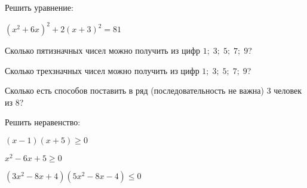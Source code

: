 \begin{listofex}
		\item Решить уравнение:
	\begin{enumcols}[itemcolumns=2]
		\item {}
		\item {}
		\item \( (x^2+6x)^2+2(x+3)^2=81 \) 
		\item {}
	\end{enumcols}
	\item Сколько пятизначных чисел можно получить из цифр \( 1;\;3;\;5;\;7;\;9 \)?
	\item Сколько трехзначных чисел можно получить из цифр \( 1;\;3;\;5;\;7;\;9 \)?
	\item Сколько есть способов поставить в ряд (последовательность не важна) 3 человек из 8?
	\item {}
	\item Решить неравенство:
	\begin{enumcols}[itemcolumns=2]
		\item \( (x-1)(x+5)\ge0 \) \answer{\( [-12;0,5] \)}
		\item \( x^2-6x+5\ge0 \) \answer{\( (-\infty;1]\cup[18;+\infty) \)}
		\item \( (3x^2-8x+4)(5x^2-8x-4)\le0 \)
	\end{enumcols}
\end{listofex}